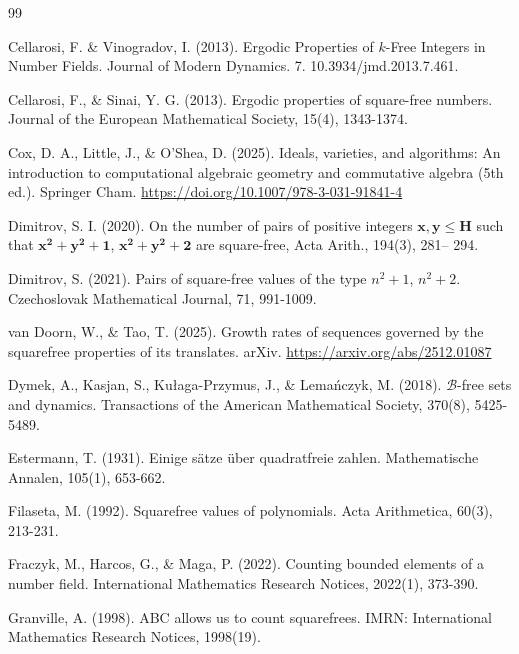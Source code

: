 \documentclass[a4paper,11pt,reqno]{amsart}
\theoremstyle{plain}
\theoremstyle{remark}
\begin{document}
\begin{thebibliography}{99}
					
					
					Cellarosi, F. \& Vinogradov, I. (2013). Ergodic Properties of $k$-Free Integers in Number Fields. Journal of Modern Dynamics. 7. 10.3934/jmd.2013.7.461. 
					
					Cellarosi, F., \& Sinai, Y. G. (2013). Ergodic properties of square-free numbers. Journal of the European Mathematical Society, 15(4), 1343-1374.
					
					Cox, D. A., Little, J., \& O'Shea, D. (2025). Ideals, varieties, and algorithms: An introduction to computational algebraic geometry and commutative algebra (5th ed.). Springer Cham. \url{https://doi.org/10.1007/978-3-031-91841-4}
					
					
					Dimitrov, S. I. (2020). On the number of pairs of positive integers $\mathbf {x, y\leq H} $ such that $\mathbf {x^ 2+ y^ 2+ 1} $, $\mathbf {x^ 2+ y^ 2+ 2} $ are square-free, Acta Arith., 194(3), 281– 294.
					
					Dimitrov, S. (2021). Pairs of square-free values of the type $n^2+ 1$, $n^2+ 2$. Czechoslovak Mathematical Journal, 71, 991-1009.
					
					van Doorn, W., \& Tao, T. (2025). Growth rates of sequences governed by the squarefree properties of its translates. arXiv. \url{https://arxiv.org/abs/2512.01087}
					
					
					
					
					Dymek, A., Kasjan, S., Kułaga-Przymus, J., \& Lemańczyk, M. (2018). $\mathcal{B}$-free sets and dynamics. Transactions of the American Mathematical Society, 370(8), 5425-5489.
					
					
					Estermann, T. (1931). Einige sätze über quadratfreie zahlen. Mathematische Annalen, 105(1), 653-662.
					
					Filaseta, M. (1992). Squarefree values of polynomials. Acta Arithmetica, 60(3), 213-231.
					
					
					
					
					Fraczyk, M., Harcos, G., \& Maga, P. (2022). Counting bounded elements of a number field. International Mathematics Research Notices, 2022(1), 373-390.
					
					
					Granville, A. (1998). ABC allows us to count squarefrees. IMRN: International Mathematics Research Notices, 1998(19).
					

\end{thebibliography}
\end{document}
